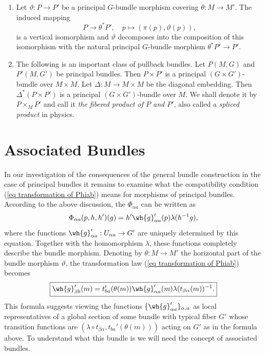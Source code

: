 \begin{rem}\label{rem 1.1.9 RS2}
    \begin{enumerate}
        \item Let $\vartheta:P\to P'$ be a principal $G$-bundle morphism covering $\theta:M\to M'$. The induced mapping
        \[P\to \theta^\ast P',\quad p\mapsto (\pi(p),\vartheta(p)),\]
        is a vertical isomorphism and $\vartheta$ decomposes into the composition of this isomorphism with the natural principal $G$-bundle morphism $\theta^\ast P'\to P'$.
        \item The following is an important class of pullback bundles. Let $P(M,G)$ and $P'(M,G')$ be principal bundles. Then $P\times P'$ is a principal $(G\times G')$-bundle over $M\times M$. Let $\Delta:M\to M\times M$ be the diagonal embedding. Then $\Delta^\ast(P\times P')$ is a principal $(G\times G')$-bundle over $M$. We shall denote it by $P\times_M P'$ and call it \emph{the fibered product of $P$ and $P'$}, also called a \emph{spliced product} in physics.
    \end{enumerate}
\end{rem}








\section{Associated Bundles}\label{sec: assoc bundles}


In our investigation of the consequences of the general bundle construction in the case of principal bundles it remains to examine what the compatibility condition (\ref{eq transformation of Phiab}) means for morphisms of principal bundles. According to the above discussion, the $\Phi_{\alpha a}$ can be written as
\[\Phi_{\alpha a}(p,h,h')(g)=h'\wh{g}'_{\alpha a}(p)\lambda(h^{-1}g),\]
where the functions $\wh{g}'_{\alpha a}:U_{\alpha a}\to G'$ are uniquely determined by this equation.  Together with the homomorphism $\lambda$, these functions completely describe the bundle morphism. Denoting by $\theta:M\to M'$ the horizontal part of the bundle morphism $\vartheta$, the transformation law (\ref{eq transformation of Phiab}) becomes
\[\boxed{\wh{g}'_{\beta b}(m)=t_{ba}'(\theta(m))\wh{g}_{\alpha a}'(m)\lambda(t_{\beta\alpha}(m))^{-1}.}\label{eq trans rule for ghat}\]
This formula suggests viewing the functions $\{\wh{g}'_{\alpha a}\}_{\alpha,a}$ as local representatives of a global section of some bundle with typical fiber $G'$ whose transition functions are $(\lambda\circ t_{\beta\alpha},t_{ba}'(\theta(m)))$ acting on $G'$ as in the formula above. To understand what this bundle is we will need the concept of associated bundles.

